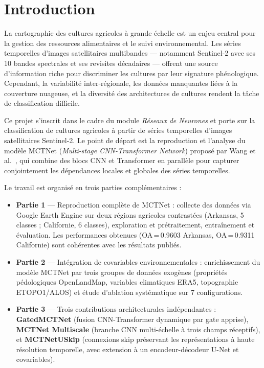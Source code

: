 
\chapter*{Introduction}

La cartographie des cultures agricoles à grande échelle est un enjeu central
pour la gestion des ressources alimentaires et le suivi environnemental. Les
séries temporelles d'images satellitaires multibandes — notamment Sentinel-2
avec ses 10 bandes spectrales et ses revisites décadaires — offrent une source
d'information riche pour discriminer les cultures par leur signature phénologique.
Cependant, la variabilité inter-régionale, les données manquantes liées à la
couverture nuageuse, et la diversité des architectures de cultures rendent la
tâche de classification difficile.

Ce projet s'inscrit dans le cadre du module \textit{Réseaux de Neurones} et
porte sur la classification de cultures agricoles à partir de séries temporelles
d'images satellitaires Sentinel-2. Le point de départ est la reproduction et
l'analyse du modèle MCTNet (\textit{Multi-stage CNN-Transformer Network})
proposé par Wang et al.~\cite{wang2024}, qui combine des blocs CNN et Transformer
en parallèle pour capturer conjointement les dépendances locales et globales
des séries temporelles.

Le travail est organisé en trois parties complémentaires :

\begin{itemize}
  \item \textbf{Partie 1} — Reproduction complète de MCTNet : collecte des
        données via Google Earth Engine sur deux régions agricoles contrastées
        (Arkansas, 5 classes ; Californie, 6 classes), exploration et
        prétraitement, entraînement et évaluation. Les performances obtenues
        (OA\,=\,0.9603 Arkansas, OA\,=\,0.9311 Californie) sont cohérentes
        avec les résultats publiés.

  \item \textbf{Partie 2} — Intégration de covariables environnementales :
        enrichissement du modèle MCTNet par trois groupes de données exogènes
        (propriétés pédologiques OpenLandMap, variables climatiques ERA5,
        topographie ETOPO1/ALOS) et étude d'ablation systématique sur 7
        configurations.

  \item \textbf{Partie 3} — Trois contributions architecturales indépendantes :
        \textbf{GatedMCTNet} (fusion CNN-Transformer dynamique par gate apprise),
        \textbf{MCTNet Multiscale} (branche CNN multi-échelle à trois champs
        réceptifs), et \textbf{MCTNetUSkip} (connexions skip préservant les
        représentations à haute résolution temporelle, avec extension à un
        encodeur-décodeur U-Net et covariables).
\end{itemize}

\cleardoublepage
